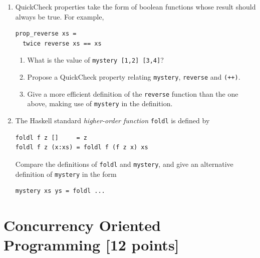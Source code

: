 \documentclass{article}
\begin{document}
\begin{enumerate}
\begin{enumerate}
\end{enumerate}
\item
QuickCheck properties take the form of boolean functions whose result
should always be true. For example,
\begin{verbatim}
prop_reverse xs =
  twice reverse xs == xs
\end{verbatim}
\begin{enumerate}
\item
What is the value of \verb!mystery [1,2] [3,4]!?
\item
Propose a QuickCheck property relating \verb!mystery!, \verb!reverse!
and \verb!(++)!.
\item
Give a more efficient definition of the \verb!reverse! function than
the one above, making use of \verb!mystery! in the definition.
\end{enumerate}

\item
The Haskell standard {\em higher-order function} \verb!foldl! is defined by
\begin{verbatim}
foldl f z []     = z
foldl f z (x:xs) = foldl f (f z x) xs
\end{verbatim}
Compare the definitions of \verb!foldl! and \verb!mystery!, and give
an alternative definition of \verb!mystery! in the form
\begin{verbatim}
mystery xs ys = foldl ...
\end{verbatim}

\end{enumerate}



\newpage
\section{Concurrency Oriented Programming [12 points]}
\end{document}
